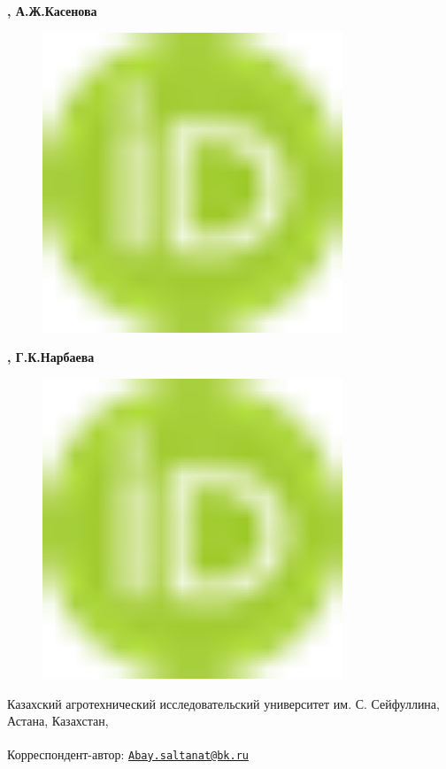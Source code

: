 {\bfseries ,
А.Ж.Касенова}
\begin{figure}[H]
	\centering
	\includegraphics[width=0.8\textwidth]{media/ekon2/image1}
	\caption*{}
\end{figure}
{\bfseries ,
Г.К.Нарбаева}
\begin{figure}[H]
	\centering
	\includegraphics[width=0.8\textwidth]{media/ekon2/image1}
	\caption*{}
\end{figure}


Казахский агротехнический исследовательский университет им. С.
Сейфуллина, Астана, Казахстан,

{\bfseries \textsuperscript{\envelope }}Корреспондент-автор:
\href{mailto:Abay.saltanat@bk.ru}{\nolinkurl{Abay.saltanat@bk.ru}}

